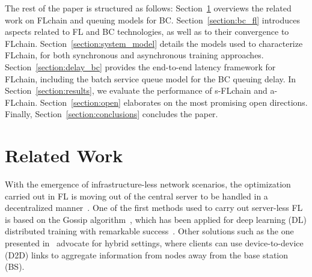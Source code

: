 \documentclass[10pt,journal,compsoc]{IEEEtran}
\begin{document}

The rest of the paper is structured as follows: Section~\ref{section:related_work} overviews the related work on FLchain and queuing models for BC. Section~\ref{section:bc_fl} introduces aspects related to FL and BC technologies, as well as to their convergence to FLchain. Section~\ref{section:system_model} details the models used to characterize FLchain, for both synchronous and asynchronous training approaches. Section~\ref{section:delay_bc} provides the end-to-end latency framework for FLchain, including the batch service queue model for the BC queuing delay. In Section~\ref{section:results}, we evaluate the performance of s-FLchain and a-FLchain. Section~\ref{section:open} elaborates on the most promising open directions. Finally, Section~\ref{section:conclusions} concludes the paper.

\section{Related Work}
\label{section:related_work}

With the emergence of infrastructure-less network scenarios, the optimization carried out in FL is moving out of the central server to be handled in a decentralized manner~\cite{lalitha2018fully}. One of the first methods used to carry out server-less FL is based on the Gossip algorithm~\cite{blot2016gossip}, which has been applied for deep learning (DL) distributed training with remarkable success~\cite{hegedHus2021decentralized}. Other solutions such as the one presented in~\cite{chen2020wireless} advocate for hybrid settings, where clients can use device-to-device (D2D) links to aggregate information from nodes away from the base station (BS).
\end{document}
